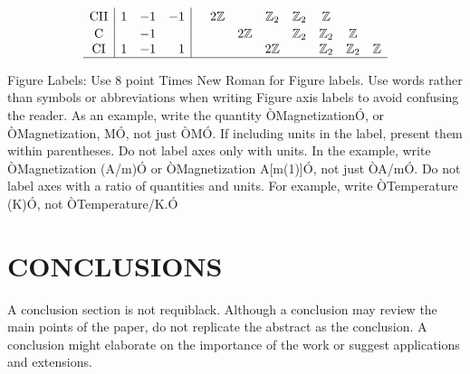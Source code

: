 \documentclass[letterpaper, 10 pt, conference]{ieeeconf}  %
\begin{document}
$$\begin{array}{c|rrr|cccccccc}
\color{black}{\textrm{CII}} & \color{black}{1} & \color{black}{-1} & \color{black}{-1} & \color{black}{} & \color{black}{2\mathbb{Z}} & \color{black}{} & \color{black}{\mathbb{Z}_2} & \color{black}{\mathbb{Z}_2} & \color{black}{\mathbb{Z}} & \color{black}{} & \color{black}{}\T\\
\color{black}{\textrm{C}} & \color{black}{} & \color{black}{-1} & \color{black}{} & \color{black}{} & \color{black}{} & \color{black}{2\mathbb{Z}} & \color{black}{} & \color{black}{\mathbb{Z}_2} & \color{black}{\mathbb{Z}_2} & \color{black}{\mathbb{Z}} & \color{black}{}\T\\
\color{black}{\textrm{CI}} & \color{black}{1} & \color{black}{-1} & \color{black}{1} & \color{black}{} & \color{black}{} & \color{black}{} & \color{black}{2\mathbb{Z}} & \color{black}{} & \color{black}{\mathbb{Z}_2} & \color{black}{\mathbb{Z}_2} & \color{black}{\mathbb{Z}}\\
\hline
\end{array}
$$


Figure Labels: Use 8 point Times New Roman for Figure labels. Use words rather than symbols or abbreviations when writing Figure axis labels to avoid confusing the reader. As an example, write the quantity ÒMagnetizationÓ, or ÒMagnetization, MÓ, not just ÒMÓ. If including units in the label, present them within parentheses. Do not label axes only with units. In the example, write ÒMagnetization (A/m)Ó or ÒMagnetization {A[m(1)]}Ó, not just ÒA/mÓ. Do not label axes with a ratio of quantities and units. For example, write ÒTemperature (K)Ó, not ÒTemperature/K.Ó

\section{CONCLUSIONS}

A conclusion section is not requiblack. Although a conclusion may review the main points of the paper, do not replicate the abstract as the conclusion. A conclusion might elaborate on the importance of the work or suggest applications and extensions.
\end{document}
